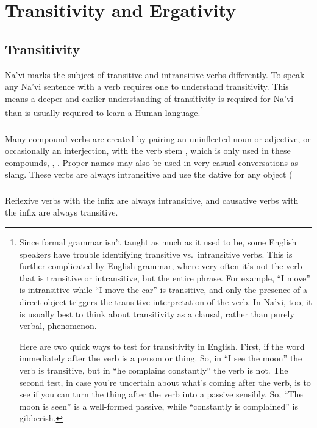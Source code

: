 
\section{Transitivity and Ergativity}

\subsection{Transitivity} Na'vi marks the subject of transitive and
intransitive verbs differently.  To speak any Na'vi sentence
with a verb requires one to understand transitivity.  This means a
deeper and earlier understanding of transitivity is required for Na'vi
than is usually required to learn a Human language.\footnote{Since
formal grammar isn't taught as much as it used to be, some English
speakers have trouble identifying transitive vs.\ intransitive
verbs.  This is further complicated by English grammar, where very
often it's not the verb that is transitive or intransitive, but the
entire phrase.  For example, ``I move'' is intransitive while ``I
move the car'' is transitive, and only the presence of a direct
object triggers the transitive interpretation of the verb.  In
Na'vi, too, it is usually best to think about transitivity as a
clausal, rather than purely verbal, phenomenon.

Here are two quick ways to test for transitivity in English.  First,
if the word immediately after the verb is a person or thing.  So, in
``I see the moon'' the verb is transitive, but in ``he complains
constantly'' the verb is not.  The second test, in case you're
uncertain about what's coming after the verb, is to see if you can
turn the thing after the verb into a passive sensibly.  So, ``The moon
is seen'' is a well-formed passive, while ``constantly is complained''
is gibberish.}

\subsubsection{} Many compound verbs are created by pairing an
uninflected noun or adjective, or occasionally an interjection,
with the verb stem  , which is only used 
in these compounds,  ,  .
Proper names may also be used in very casual conversations as slang.
These verbs are always intransitive and use the dative for any object
(

\subsubsection{} Reflexive verbs with the  infix are
always intransitive, and causative verbs with the  infix
are always transitive.


